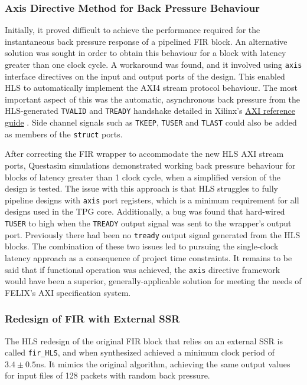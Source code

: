 \documentclass[10pt]{article}
\begin{document}
\subsubsection{Axis Directive Method for Back Pressure Behaviour} \label{axi4_method}

Initially, it proved difficult to achieve the performance required for the instantaneous back pressure response of a pipelined FIR block. An alternative solution was sought in order to obtain this behaviour for a block with latency greater than one clock cycle. A workaround was found, and it involved using \texttt{axis} interface directives on the input and output ports of the design. This enabled HLS to automatically implement the AXI4 stream protocol behaviour. The most important aspect of this was the automatic, asynchronous back pressure from the HLS-generated \texttt{TVALID} and \texttt{TREADY} handshake detailed in Xilinx's  \href{https://www.xilinx.com/support/documentation/ip_documentation/ug761_axi_reference_guide.pdf}{AXI reference guide} \cite{xilinx.com_2017}. Side channel signals such as \texttt{TKEEP}, \texttt{TUSER} and \texttt{TLAST} could also be added as members of the \texttt{struct} ports.

After correcting the FIR wrapper to accommodate the new HLS AXI stream ports, Questasim simulations demonstrated working back pressure behaviour for blocks of latency greater than 1 clock cycle, when a simplified version of the design is tested. The issue with this approach is that HLS struggles to fully pipeline designs with \texttt{axis} port registers, which is a minimum requirement for all designs used in the TPG core. Additionally, a bug was found that hard-wired \texttt{TUSER} to high when the \texttt{TREADY} output signal was sent to the wrapper's output port. Previously there had been no \texttt{tready} output signal generated from the HLS blocks. The combination of these two issues led to pursuing the single-clock latency approach as a consequence of project time constraints. It remains to be said that if functional operation was achieved, the \texttt{axis} directive framework would have been a superior, generally-applicable solution for meeting the needs of FELIX's AXI specification system.

\subsubsection{Redesign of FIR with External SSR} \label{fir_ext_SSR}

The HLS redesign of the original FIR block that relies on an external SSR is called \texttt{fir\_HLS}, and when synthesized achieved a minimum clock period of $3.4\pm0.5$ns. It mimics the original algorithm, achieving the same output values for input files of 128 packets with random back pressure.
\end{document}
